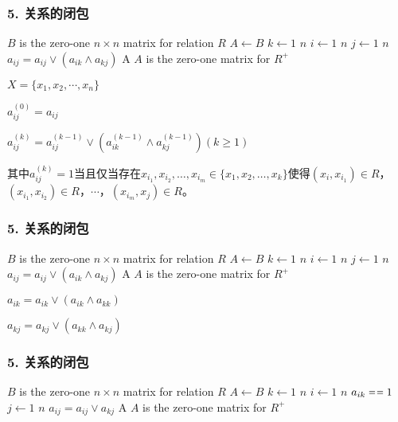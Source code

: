 \documentclass{beamer}
\begin{document}
\begin{CJK*}{UTF8}{gbsn}
\begin{frame}
  \frametitle{5. 关系的闭包}
  \begin{codebox}
    \zi \Comment $B$ is the zero-one $n \times n$ matrix for relation $R$
    \li $A \gets B$
    \li \For $k \gets 1$ \To $n$
    \li \Do
    \For $i \gets 1$ \To $n$
    \li \Do
    \For $j \gets 1$ \To $n$
    \li \Do
    $a_{ij} = a_{ij} \lor (a_{ik} \land a_{kj})$
    \End
    \End
    \End
    \li \Return A \Comment $A$ is the zero-one matrix for $R^+$
  \end{codebox}  
  \pause

  $X=\{x_1,x_2,\cdots,x_n\}$

  \pause

  $a_{ij}^{(0)}=a_{ij}$

  \pause

  $a_{ij}^{(k)}= a_{ij}^{(k-1)}\lor (a_{ik}^{(k-1)}\land a_{kj}^{(k-1)}) (k\geq 1)$

  \pause

  其中$a_{ij}^{(k)}=1$当且仅当存在$x_{i_1},x_{i_2},\ldots,x_{i_m}\in \{x_1,x_2,\ldots,x_k\}$使得$(x_i,x_{i_1})\in R$，$(x_{i_1},x_{i_2})\in R$，$\cdots$，$(x_{i_m},x_j)\in R$。
\end{frame}

\begin{frame}
  \frametitle{5. 关系的闭包}
  \begin{codebox}
    \zi \Comment $B$ is the zero-one $n \times n$ matrix for relation $R$
    \li $A \gets B$
    \li \For $k \gets 1$ \To $n$
    \li \Do
    \For $i \gets 1$ \To $n$
    \li \Do
    \For $j \gets 1$ \To $n$
    \li \Do
    $a_{ij} = a_{ij} \lor (a_{ik} \land a_{kj})$
    \End
    \End
    \End
    \li \Return A \Comment $A$ is the zero-one matrix for $R^+$
  \end{codebox}  
  \pause
  $a_{ik} = a_{ik} \lor (a_{ik} \land a_{kk})$

  \pause

  $a_{kj} = a_{kj} \lor (a_{kk} \land a_{kj})$
\end{frame}


\begin{frame}
  \frametitle{5. 关系的闭包}
  \begin{codebox}
    \zi \Comment $B$ is the zero-one $n \times n$ matrix for relation $R$
    \li $A \gets B$
    \li \For $k \gets 1$ \To $n$
    \li \Do
    \For $i \gets 1$ \To $n$
    \li \Do
     \If $a_{ik} \isequal 1$
    \li \Then
    \For $j \gets 1$ \To $n$
    \li \Do
    $a_{ij} = a_{ij} \lor a_{kj}$
    \End
    \End
    \End
    \End
    \li \Return A \Comment $A$ is the zero-one matrix for $R^+$
  \end{codebox}  
\end{frame}


\end{CJK*}
\end{document}
